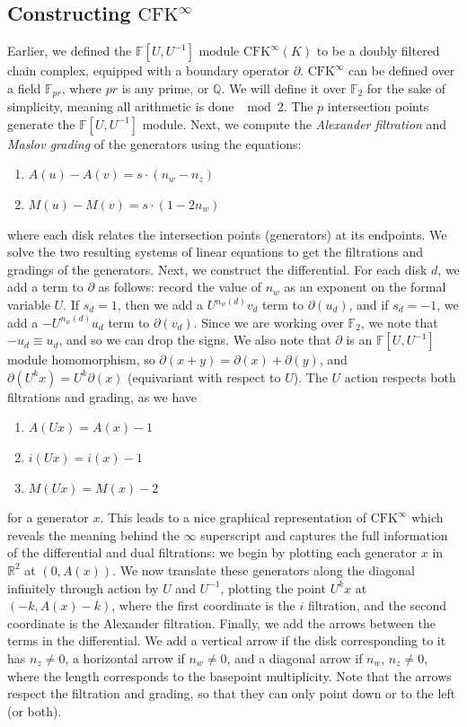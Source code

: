 \documentclass[reqno, 12pt]{amsart}
\theoremstyle{remark}
\begin{document}
\subsection{Constructing $\text{CFK}^{\infty}$}
Earlier, we defined the $\mathbb{F}[U, U^{-1}]$ module $\text{CFK}^{\infty}(K)$ to be a doubly filtered chain complex, equipped with a boundary operator $\partial$. $\text{CFK}^{\infty}$ can be defined over a field $\mathbb{F}_{pr}$, where $pr$ is any prime, or $\mathbb{Q}$. We will define it over $\mathbb{F}_2$ for the sake of simplicity, meaning all arithmetic is done $\mod{2}$. The $p$ intersection points generate the $\mathbb{F}[U, U^{-1}]$ module. Next, we compute the \textit{Alexander filtration} and \textit{Maslov grading} of the generators using the equations:
\begin{enumerate}[nosep]
	\item $A(u) - A(v) = s \cdot (n_w - n_z)$
	\item $M(u) - M(v) = s \cdot (1 - 2n_w)$
\end{enumerate}
where each disk relates the intersection points (generators) at its endpoints. We solve the two resulting systems of linear equations to get the filtrations and gradings of the generators. Next, we construct the differential. For each disk $d$, we add a term to $\partial$ as follows: record the value of $n_w$ as an exponent on the formal variable $U$. If $s_d = 1$, then we add a $U^{n_w(d)}v_d$ term to $\partial(u_d)$, and if $s_d = -1$, we add a $-U^{n_w(d)}u_d$ term to $\partial(v_d)$. Since we are working over $\mathbb{F}_2$, we note that $-u_d \equiv u_d$, and so we can drop the signs. We also note that  $\partial$ is an $\mathbb{F}[U, U^{-1}]$ module homomorphism, so $\partial(x+y) = \partial(x) +\partial(y)$, and $\partial(U^kx) =U^k\partial(x)$ (equivariant with respect to $U$). The $U$ action respects both filtrations and grading, as we have
\begin{enumerate}[nosep]
	\item $A(Ux) = A(x) - 1$
	\item $i(Ux) = i(x) - 1$
	\item $M(Ux) = M(x) - 2$
\end{enumerate}
for a generator $x$. This leads to a nice graphical representation of $\text{CFK}^{\infty}$ which reveals the meaning behind the $\infty$ superscript and captures the full information of the differential and dual filtrations: we begin by plotting each generator $x$ in $\mathbb{R}^2$ at $(0, A(x))$. We now translate these generators along the diagonal infinitely through action by $U$ and $U^{-1}$, plotting the point $U^kx$ at $(-k, A(x) - k)$, where the first coordinate is the $i$ filtration, and the second coordinate is the Alexander filtration. Finally, we add the arrows between the terms in the differential. We add a vertical arrow if the disk corresponding to it has $n_z \ne 0$, a horizontal arrow if $n_w \ne 0$, and a diagonal arrow if $n_w, \, n_z \ne 0$, where the length corresponds to the basepoint multiplicity. Note that the arrows respect the filtration and grading, so that they can only point down or to the left (or both).
\end{document}
